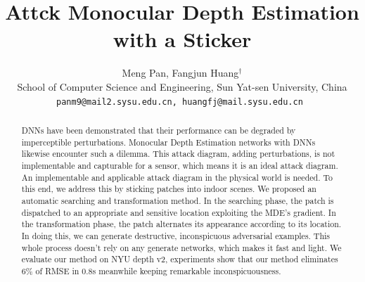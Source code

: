 \documentclass[10pt,twocolumn,letterpaper]{article}
\begin{document}
\title{Attck Monocular Depth Estimation with a Sticker}

\author{Meng Pan, Fangjun Huang$^\dagger$\\
 School of Computer Science and Engineering, 
Sun Yat-sen University, China\\
{\tt\small panm9@mail2.sysu.edu.cn, huangfj@mail.sysu.edu.cn
}}
\maketitle
\def\thefootnote{$\dagger$}\def\thefootnote{\arabic{footnote}}

\begin{abstract}
	DNNs have been demonstrated that their performance 
	can be degraded by imperceptible perturbations. 
	Monocular Depth Estimation networks with 
	DNNs likewise encounter such a dilemma. 
	This attack diagram, adding perturbations, 
	is not implementable and capturable for a sensor, 
	which means it is an ideal attack diagram. 
	An implementable and applicable attack diagram in 
	the physical world is needed. To this end, we 
	address this by sticking patches into indoor scenes. 
	We proposed an automatic searching and 
	transformation method. In the searching phase, 
	the patch is dispatched to an appropriate and 
	sensitive location exploiting the MDE's gradient. 
	In the transformation phase, the patch alternates 
	its appearance according to its location. 
	In doing this, we can generate destructive, 
	inconspicuous adversarial examples. 
	This whole process doesn't rely on any generate
	networks, which makes it fast and light.
	We evaluate our method on NYU depth v2, 
	experiments show that our method 
	eliminates 6\% of RMSE in 0.8s 
	meanwhile 
	keeping remarkable inconspicuousness.
\end{abstract}
\end{document}
